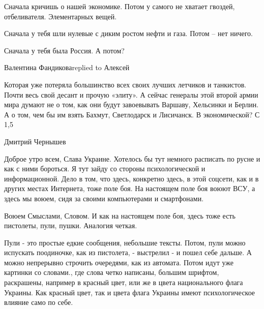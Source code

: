 Сначала кричишь о нашей экономике. Потом у самого не хватает гвоздей, отбеливателя. Элементарных вещей.

Сначала у тебя шли нулевые с диким ростом нефти и газа. Потом – нет ничего.

Сначала у тебя была Россия. А потом?

Валентина Фандиковаreplied to Алексей

Которая уже потеряла большинство всех своих лучших летчиков и танкистов. Почти весь свой десант и прочую «элиту». А сейчас генералы этой второй армии мира думают не о том, как они будут завоевывать Варшаву, Хельсинки и Берлин. А о том, чем бы им взять Бахмут, Светлодарск и Лисичанск. В экономической? С 1,5%

Дмитрий Чернышев

Доброе утро всем, Слава Украине. Хотелось бы тут немного расписать по русне и
как с ними бороться.  Я тут зайду со стороны психологической и информационной.
Дело в том, что
здесь, конкретно здесь, в этой соцсети, как и в других местах Интернета, тоже
поле боя. На настоящем поле боя воюют ВСУ, а здесь мы воюем, сидя за своими компьютерами и смартфонами.

Воюем Смыслами, Словом. И как на настоящем поле боя, здесь тоже есть пистолеты, пули, пушки. Аналогия четкая.

Пули - это простые едкие сообщения, небольшие тексты. Потом, пули можно
испускать поодиночке, как из пистолета, - выстрелил - и пошел себе дальше. А
можно непрерывно строчить очередями, как из автомата.  Потом идут уже картинки
со словами., где слова четко написаны, большим шрифтом, раскрашены, например в
красный цвет, или же в цвета национального флага Украины. Как красный цвет, так
и цвета флага Украины имеют психологическое влияние само по себе.

